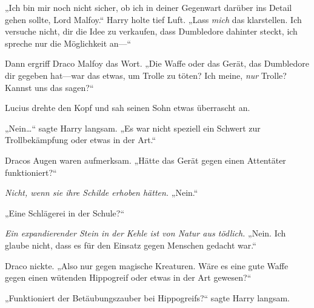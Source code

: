 „Ich bin mir noch nicht sicher, ob ich in deiner Gegenwart darüber ins Detail gehen sollte, Lord Malfoy.“
Harry holte tief Luft.
„Lass \emph{mich} das klarstellen. Ich versuche nicht, dir die Idee zu verkaufen, dass Dumbledore dahinter steckt, ich spreche nur die Möglichkeit an—“

Dann ergriff Draco Malfoy das Wort.
„Die Waffe oder das Gerät, das Dumbledore dir gegeben hat—war das etwas, um Trolle zu töten? Ich meine, \emph{nur} Trolle? Kannst uns das sagen?“

Lucius drehte den Kopf und sah seinen Sohn etwas überrascht an.

„Nein…“ sagte Harry langsam. „Es war nicht speziell ein Schwert zur Trollbekämpfung oder etwas in der Art.“

Dracos Augen waren aufmerksam.
„Hätte das Gerät gegen einen Attentäter funktioniert?“

\emph{Nicht, wenn sie ihre Schilde erhoben hätten.}
„Nein.“

„Eine Schlägerei in der Schule?“

\emph{Ein expandierender Stein in der Kehle ist von Natur aus tödlich.}
„Nein. Ich glaube nicht, dass es für den Einsatz gegen Menschen gedacht war.“

Draco nickte.
„Also nur gegen magische Kreaturen. Wäre es eine gute Waffe gegen einen wütenden Hippogreif oder etwas in der Art gewesen?“

„Funktioniert der Betäubungszauber bei Hippogreifs?“ sagte Harry langsam.

